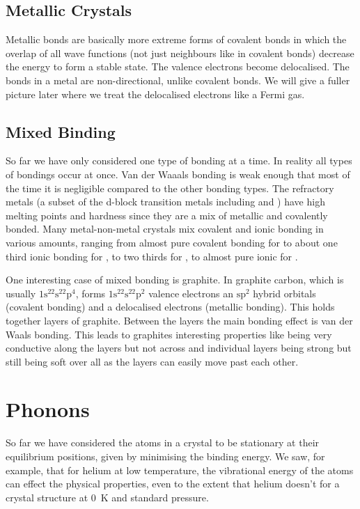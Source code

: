 \documentclass[fleqn]{NotesClass}
\begin{document}
    \section{Metallic Crystals}
    Metallic bonds are basically more extreme forms of covalent bonds in which the overlap of all wave functions (not just neighbours like in covalent bonds) decrease the energy to form a stable state.
    The valence electrons become delocalised.
    The bonds in a metal are non-directional, unlike covalent bonds.
    We will give a fuller picture later where we treat the delocalised electrons like a Fermi gas.
    
    \section{Mixed Binding}
    So far we have only considered one type of bonding at a time.
    In reality all types of bondings occur at once.
    Van der Waaals bonding is weak enough that most of the time it is negligible compared to the other bonding types.
    The refractory metals (a subset of the d-block transition metals including  and ) have high melting points and hardness since they are a mix of metallic and covalently bonded.
    Many metal-non-metal crystals mix covalent and ionic bonding in various amounts, ranging from almost pure covalent bonding for  to about one third ionic bonding for , to two thirds for , to almost pure ionic for .
    
    One interesting case of mixed bonding is graphite.
    In graphite carbon, which is usually \(\mathrm{1s^22s^22p^4}\), forms \(\mathrm{1s^22s^22p^2}\) valence electrons an \(\mathrm{sp^2}\) hybrid orbitals (covalent bonding) and a delocalised electrons (metallic bonding).
    This holds together layers of graphite.
    Between the layers the main bonding effect is van der Waals bonding.
    This leads to graphites interesting properties like being very conductive along the layers but not across and individual layers being strong but still being soft over all as the layers can easily move past each other.
    
    \chapter{Phonons}
    So far we have considered the atoms in a crystal to be stationary at their equilibrium positions, given by minimising the binding energy.
    We saw, for example, that for helium at low temperature, the vibrational energy of the atoms can effect the physical properties, even to the extent that helium doesn't for a crystal structure at \qty{0}{\kelvin} and standard pressure.
    
\end{document}
